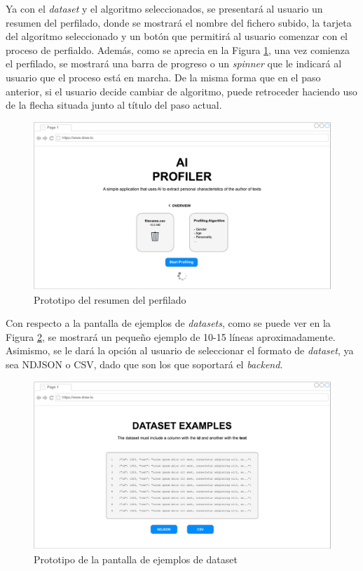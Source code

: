 \bigskip
Ya con el \textit{dataset} y el algoritmo seleccionados, se presentará al usuario un resumen del perfilado, donde se mostrará
el nombre del fichero subido, la tarjeta del algoritmo seleccionado y un botón que permitirá al usuario comenzar con el proceso de perfialdo.
Además, como se aprecia en la Figura \ref{fig:prototipo_resumen_perfilado}, una vez comienza el perfilado, se mostrará una barra de progreso
o un \textit{spinner} que le indicará al usuario que el proceso está en marcha. De la misma forma que en el paso anterior, si el usuario
decide cambiar de algoritmo, puede retroceder haciendo uso de la flecha situada junto al título del paso actual.

\bigskip
\begin{figure}[H]
	\centering
	\includegraphics[width=\textwidth]{diagramas/landing-overview.pdf}
	\caption{Prototipo del resumen del perfilado}
	\label{fig:prototipo_resumen_perfilado}
\end{figure}

\bigskip
Con respecto a la pantalla de ejemplos de \textit{datasets}, como se puede ver en la Figura \ref{fig:prototipo_ejemplos_dataset},
se mostrará un pequeño ejemplo de 10-15 líneas aproximadamente. Asimismo, se le dará la opción al usuario de seleccionar el 
formato de \textit{dataset}, ya sea NDJSON o CSV, dado que son los que soportará el \textit{backend}.

\bigskip
\begin{figure}[H]
	\centering
	\includegraphics[width=\textwidth]{diagramas/dataset-examples.pdf}
	\caption{Prototipo de la pantalla de ejemplos de dataset}
	\label{fig:prototipo_ejemplos_dataset}
\end{figure}

